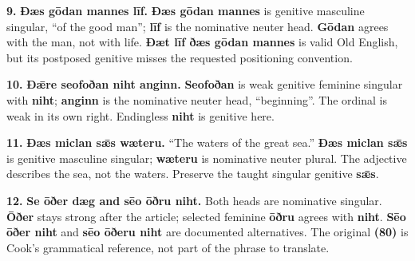 \par\begin{minipage}{\linewidth}\raggedright
\textbf{9.} \textbf{Ðæs gōdan mannes līf.} \textbf{Ðæs gōdan mannes} is genitive masculine singular, “of the good man”; \textbf{līf} is the nominative neuter head. \textbf{Gōdan} agrees with the man, not with life. \textbf{Ðæt līf ðæs gōdan mannes} is valid Old English, but its postposed genitive misses the requested positioning convention.

\end{minipage}\par\addvspace{4pt}

\par\begin{minipage}{\linewidth}\raggedright
\textbf{10.} \textbf{Ðǣre seofoðan niht anginn.} \textbf{Seofoðan} is weak genitive feminine singular with \textbf{niht}; \textbf{anginn} is the nominative neuter head, “beginning”. The ordinal is weak in its own right. Endingless \textbf{niht} is genitive here.

\end{minipage}\par\addvspace{4pt}

\par\begin{minipage}{\linewidth}\raggedright
\textbf{11.} \textbf{Ðæs miclan sǣs wæteru.} “The waters of the great sea.” \textbf{Ðæs miclan sǣs} is genitive masculine singular; \textbf{wæteru} is nominative neuter plural. The adjective describes the sea, not the waters. Preserve the taught singular genitive \textbf{sǣs}.

\end{minipage}\par\addvspace{4pt}

\par\begin{minipage}{\linewidth}\raggedright
\textbf{12.} \textbf{Se ōðer dæg and sēo ōðru niht.} Both heads are nominative singular. \textbf{Ōðer} stays strong after the article; selected feminine \textbf{ōðru} agrees with \textbf{niht}. \textbf{Sēo ōðer niht} and \textbf{sēo ōðeru niht} are documented alternatives. The original \textbf{(80)} is Cook’s grammatical reference, not part of the phrase to translate.

\end{minipage}\par\addvspace{4pt}

